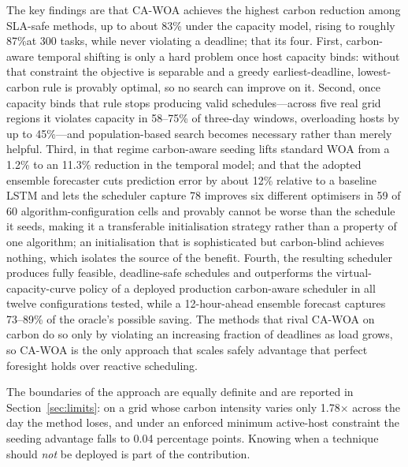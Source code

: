 \documentclass[12pt,a4paper]{article}
\providecommand{\DIFaddtex}[1]{{\protect\color{blue} \sf #1}} %
\providecommand{\DIFdeltex}[1]{{\protect\color{red} \scriptsize #1}} %
\providecommand{\DIFaddbegin}{} %
\providecommand{\DIFaddend}{} %
\providecommand{\DIFdelbegin}{} %
\providecommand{\DIFdelend}{} %
\providecommand{\DIFadd}[1]{\texorpdfstring{\DIFaddtex{#1}}{#1}} %
\providecommand{\DIFdel}[1]{\texorpdfstring{\DIFdeltex{#1}}{}} %
\providecommand{\DIFscaledelfig}{0.5}
\newlength{\DIFdelgraphicswidth} %
\newlength{\DIFdelgraphicsheight} %
\providecommand{\DIFaddincludegraphics}[2][]{{\color{blue}\fbox{\DIFOincludegraphics[#1]{#2}}}} %
\providecommand{\DIFdelincludegraphics}[2][]{%
\sbox{\DIFdelgraphicsbox}{\DIFOincludegraphics[#1]{#2}}%
\settoboxwidth{\DIFdelgraphicswidth}{\DIFdelgraphicsbox} %
\settoboxtotalheight{\DIFdelgraphicsheight}{\DIFdelgraphicsbox} %
\scalebox{\DIFscaledelfig}{%
\parbox[b]{\DIFdelgraphicswidth}{\usebox{\DIFdelgraphicsbox}\\[-\baselineskip] \rule{\DIFdelgraphicswidth}{0em}}\llap{\resizebox{\DIFdelgraphicswidth}{\DIFdelgraphicsheight}{%
\setlength{\unitlength}{\DIFdelgraphicswidth}%
\begin{picture}(1,1)%
\thicklines\linethickness{2pt} %
{\color[rgb]{1,0,0}\put(0,0){\framebox(1,1){}}}%
{\color[rgb]{1,0,0}\put(0,0){\line( 1,1){1}}}%
{\color[rgb]{1,0,0}\put(0,1){\line(1,-1){1}}}%
\end{picture}%
}\hspace*{3pt}}} %
} %
\DeclareRobustCommand{\DIFaddbegin}{\DIFOaddbegin \let\includegraphics\DIFaddincludegraphics} %
\DeclareRobustCommand{\DIFaddend}{\DIFOaddend \let\includegraphics\DIFOincludegraphics} %
\DeclareRobustCommand{\DIFdelbegin}{\DIFOdelbegin \let\includegraphics\DIFdelincludegraphics} %
\DeclareRobustCommand{\DIFdelend}{\DIFOaddend \let\includegraphics\DIFOincludegraphics} %
\begin{document}
The key findings are \DIFdelbegin \DIFdel{that CA-WOA achieves the highest carbon reduction among SLA-safe methods, up to about
83\% under the capacity model,
rising to roughly 87\%at 300 tasks, while never violating a deadline; that its }\DIFdelend \DIFaddbegin \DIFadd{four. First, }\DIFaddend carbon-aware \DIFaddbegin \DIFadd{temporal shifting is only a hard problem once host capacity
binds: without that constraint the objective is separable and a greedy earliest-deadline, lowest-carbon rule
is provably optimal, so no search can improve on it. Second, once capacity binds that rule stops producing
valid schedules---across five real grid regions it violates capacity in 58--75\% of three-day windows,
overloading hosts by up to 45\%---and population-based search becomes necessary rather than merely helpful.
Third, in that regime carbon-aware }\DIFaddend seeding \DIFdelbegin \DIFdel{lifts standard WOA from a 1.2\% to an 11.3\% reduction in the temporal model; and that the adopted ensemble forecaster cuts prediction error by about 12\% relative to a baseline LSTM and lets the scheduler capture 78}\DIFdelend \DIFaddbegin \DIFadd{improves six different optimisers in 59 of 60
algorithm-configuration cells and provably cannot be worse than the schedule it seeds, making it a
transferable initialisation strategy rather than a property of one algorithm; an initialisation that is
sophisticated but carbon-blind achieves nothing, which isolates the source of the benefit. Fourth, the
resulting scheduler produces fully feasible, deadline-safe schedules and outperforms the virtual-capacity-curve
policy of a deployed production carbon-aware scheduler in all twelve configurations tested, while a
12-hour-ahead ensemble forecast captures 73--89}\DIFaddend \% of the \DIFdelbegin \DIFdel{oracle's possible saving.
The methods that rival CA-WOA on carbon do so only by
violating an increasing fraction of deadlines as load grows, so CA-WOA is the only approach that scales safely}\DIFdelend \DIFaddbegin \DIFadd{advantage that perfect foresight holds over
reactive scheduling.
}

\DIFadd{The boundaries of the approach are equally definite and are reported in Section~\ref{sec:limits}: on a grid
whose carbon intensity varies only 1.78$\times$ across the day the method loses, and under an enforced
minimum active-host constraint the seeding advantage falls to 0.04 percentage points. Knowing when a technique
should \emph{not} be deployed is part of the contribution}\DIFaddend .
\end{document}
